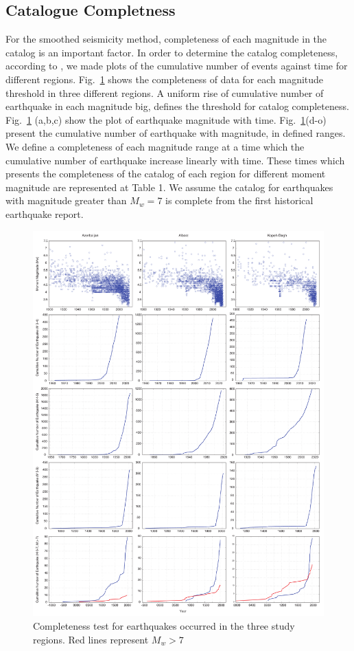 \subsection{Catalogue Completness}
For the smoothed seismicity method, completeness of each magnitude in the catalog is an important factor. In order to determine the catalog completeness, according to \citet{Frankel1995}, we made plots of the cumulative number of events against time for different regions.   Fig.~\ref{fig:comptest} shows the completeness of data for each magnitude threshold in three different regions.
A uniform rise of cumulative number of earthquake in each magnitude big, defines the threshold for catalog completeness. Fig.~\ref{fig:comptest} (a,b,c) show the plot of earthquake magnitude with time. Fig.~\ref{fig:comptest}(d-o) present the cumulative number of earthquake with magnitude, in defined ranges. We define a completeness of each magnitude range at a time which the cumulative number of earthquake increase linearly with time. These times which presents the completeness of the catalog of each region for different moment magnitude are represented at Table 1. We assume the catalog for earthquakes with magnitude greater than $M_w=7$ is complete from the first historical earthquake report. 

\begin{figure} [!ht]
\centering
\includegraphics[scale=0.3]{figures/pdf/Figure4.pdf} 
\caption{Completeness test for earthquakes occurred in the three study regions. Red lines represent $M_w > 7$ }
\label{fig:comptest}
\end{figure}



